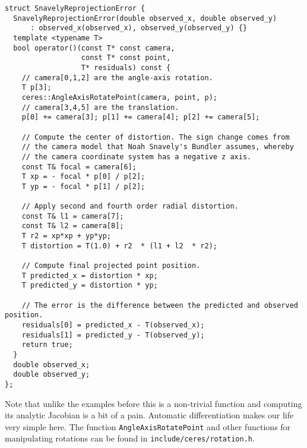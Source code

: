 \clearpage
\begin{verbatim}
struct SnavelyReprojectionError {
  SnavelyReprojectionError(double observed_x, double observed_y)
      : observed_x(observed_x), observed_y(observed_y) {}
  template <typename T>
  bool operator()(const T* const camera,
                  const T* const point,
                  T* residuals) const {
    // camera[0,1,2] are the angle-axis rotation.
    T p[3];
    ceres::AngleAxisRotatePoint(camera, point, p);
    // camera[3,4,5] are the translation.
    p[0] += camera[3]; p[1] += camera[4]; p[2] += camera[5];

    // Compute the center of distortion. The sign change comes from
    // the camera model that Noah Snavely's Bundler assumes, whereby
    // the camera coordinate system has a negative z axis.
    const T& focal = camera[6];
    T xp = - focal * p[0] / p[2];
    T yp = - focal * p[1] / p[2];

    // Apply second and fourth order radial distortion.
    const T& l1 = camera[7];
    const T& l2 = camera[8];
    T r2 = xp*xp + yp*yp;
    T distortion = T(1.0) + r2  * (l1 + l2  * r2);

    // Compute final projected point position.
    T predicted_x = distortion * xp;
    T predicted_y = distortion * yp;

    // The error is the difference between the predicted and observed position.
    residuals[0] = predicted_x - T(observed_x);
    residuals[1] = predicted_y - T(observed_y);
    return true;
  }
  double observed_x;
  double observed_y;
};
\end{verbatim}

Note that unlike the
examples before this is a non-trivial function and computing its
analytic Jacobian is a bit of a pain. Automatic differentiation makes
our life very simple here. The function \texttt{AngleAxisRotatePoint} and other functions for manipulating rotations can be found in \texttt{include/ceres/rotation.h}.  


